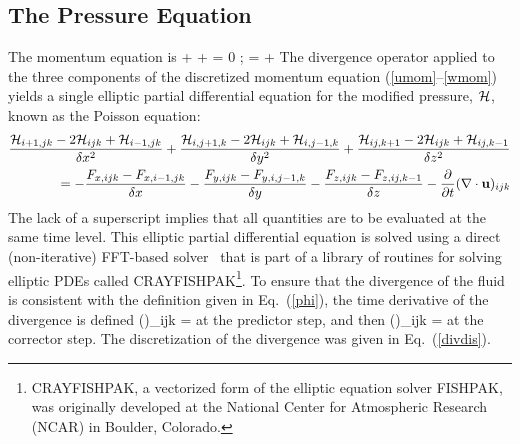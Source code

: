 \documentclass[11pt]{book}
\begin{document}
\clearpage
\subsection{The Pressure Equation}

The momentum equation is
\be {} + \bF + \nabla \cH = 0 \quad ; \quad \cH =  + \frac{\tp}{\rho}  \ee
The divergence operator applied to the three components of the
discretized momentum equation (\ref{umom}--\ref{wmom}) yields a
single elliptic partial differential equation for the modified pressure, ${\cal H}$, known as the Poisson equation:
\begin{eqnarray}
\frac{{\cal H}_{i+1,jk}-2{\cal H}_{ijk}+{\cal H}_{i-1,jk}}{\delta x^2} +
\frac{{\cal H}_{i,j+1,k}-2{\cal H}_{ijk}+{\cal H}_{i,j-1,k}}{\delta y^2} +
\frac{{\cal H}_{ij,k+1}-2{\cal H}_{ijk}+{\cal H}_{ij,k-1}}{\delta z^2} \nonumber \\ =
    -\frac{F_{x,ijk} - F_{x,i-1,jk}}{\delta x}
    -\frac{F_{y,ijk} - F_{y,i,j-1,k}}{\delta y}
    -\frac{F_{z,ijk} - F_{z,ij,k-1}}{\delta z} - \frac{\partial  }{\partial t}(\nabla \cdot {\bf u})_{ijk}
\end{eqnarray}
The lack of a superscript implies that all quantities are to be
evaluated at the same time level.
This elliptic partial differential equation is solved using a direct
(non-iterative) FFT-based solver~\cite{Sweet:1} that is part of a library of routines
for solving elliptic PDEs called CRAYFISHPAK\footnote{CRAYFISHPAK, a vectorized form of the
elliptic equation solver FISHPAK, was originally developed at the National Center for Atmospheric
Research (NCAR) in Boulder, Colorado.}.
To ensure that the divergence of the fluid is consistent with the definition
given in Eq.~(\ref{phi}), the time derivative of the divergence is defined
\be {}(\nabla \cdot \bu)_{ijk} =
           \ee
at the predictor step, and then
\be {}(\nabla \cdot \bu)_{ijk} =
          \ee
at the corrector step. The discretization of the divergence was
given in Eq.~(\ref{divdis}).
\end{document}
